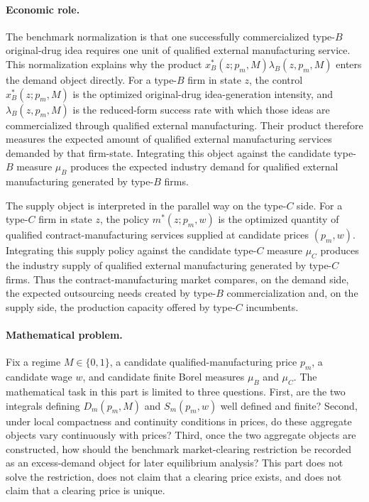 \paragraph{Economic role.}
The benchmark normalization is that one successfully commercialized type-$B$ original-drug idea requires one unit of qualified external manufacturing service. This normalization explains why the product $x_B^*(z;p_m,M)\lambda_B(z,p_m,M)$ enters the demand object directly. For a type-$B$ firm in state $z$, the control $x_B^*(z;p_m,M)$ is the optimized original-drug idea-generation intensity, and $\lambda_B(z,p_m,M)$ is the reduced-form success rate with which those ideas are commercialized through qualified external manufacturing. Their product therefore measures the expected amount of qualified external manufacturing services demanded by that firm-state. Integrating this object against the candidate type-$B$ measure $\mu_B$ produces the expected industry demand for qualified external manufacturing generated by type-$B$ firms.

The supply object is interpreted in the parallel way on the type-$C$ side. For a type-$C$ firm in state $z$, the policy $m^*(z;p_m,w)$ is the optimized quantity of qualified contract-manufacturing services supplied at candidate prices $(p_m,w)$. Integrating this supply policy against the candidate type-$C$ measure $\mu_C$ produces the industry supply of qualified external manufacturing generated by type-$C$ firms. Thus the contract-manufacturing market compares, on the demand side, the expected outsourcing needs created by type-$B$ commercialization and, on the supply side, the production capacity offered by type-$C$ incumbents.

\paragraph{Mathematical problem.}
Fix a regime $M\in\{0,1\}$, a candidate qualified-manufacturing price $p_m$, a candidate wage $w$, and candidate finite Borel measures $\mu_B$ and $\mu_C$. The mathematical task in this part is limited to three questions. First, are the two integrals defining $D_m(p_m,M)$ and $S_m(p_m,w)$ well defined and finite? Second, under local compactness and continuity conditions in prices, do these aggregate objects vary continuously with prices? Third, once the two aggregate objects are constructed, how should the benchmark market-clearing restriction be recorded as an excess-demand object for later equilibrium analysis? This part does not solve the restriction, does not claim that a clearing price exists, and does not claim that a clearing price is unique.

